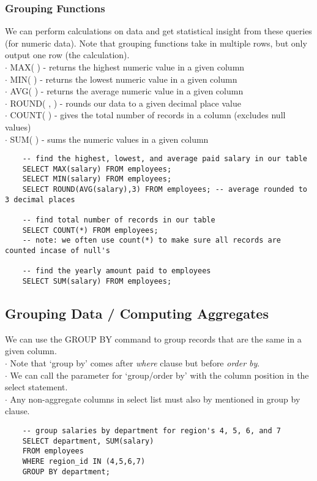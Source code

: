 \documentclass[11pt, a4paper]{article}
\begin{document}
\begin{spacing}{1.1}
	\subsubsection{Grouping Functions}
	We can perform calculations on data and get statistical insight from these queries (for numeric data). Note that grouping functions take in multiple rows, but only output one row (the calculation). \\
	\hspace*{3mm} $\cdot$ MAX( ) - returns the highest numeric value in a given column \\
	\hspace*{3mm} $\cdot$ MIN( ) - returns the lowest numeric value in a given column \\
	\hspace*{3mm} $\cdot$ AVG( ) - returns the average numeric value in a given column \\
	\hspace*{3mm} $\cdot$ ROUND( , ) - rounds our data to a given decimal place value \\
	\hspace*{3mm} $\cdot$ COUNT( ) - gives the total number of records in a column (excludes null values) \\
	\hspace*{3mm} $\cdot$ SUM( ) - sums the numeric values in a given column
	\begin{lstlisting}
	-- find the highest, lowest, and average paid salary in our table
	SELECT MAX(salary) FROM employees;
	SELECT MIN(salary) FROM employees;
	SELECT ROUND(AVG(salary),3) FROM employees; -- average rounded to 3 decimal places
	
	-- find total number of records in our table
	SELECT COUNT(*) FROM employees;
	-- note: we often use count(*) to make sure all records are counted incase of null's
	
	-- find the yearly amount paid to employees
	SELECT SUM(salary) FROM employees; 	\end{lstlisting} \newpage

	\subsection{Grouping Data / Computing Aggregates}
	We can use the GROUP BY command to group records that are the same in a given column. \\
	\hspace*{3mm} $\cdot$ Note that `group by' comes after \textit{where} clause but before \textit{order by}. \\
	\hspace*{3mm} $\cdot$ We can call the parameter for `group/order by' with the column position in the select statement. \\
	\hspace*{3mm} $\cdot$ Any non-aggregate columns in select list must also by mentioned in group by clause.
	\begin{lstlisting}
	-- group salaries by department for region's 4, 5, 6, and 7
	SELECT department, SUM(salary)
	FROM employees
	WHERE region_id IN (4,5,6,7)
	GROUP BY department; 
	

\end{lstlisting}
\end{spacing}
\end{document}
